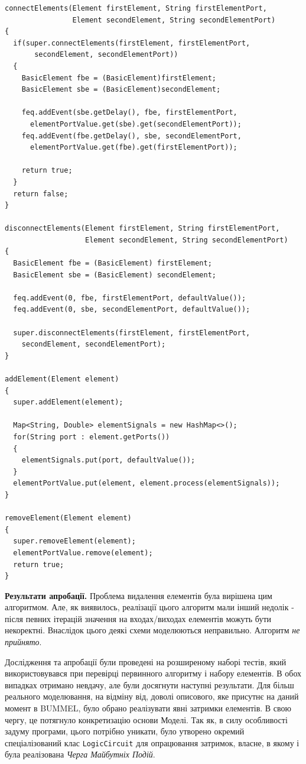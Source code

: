 \documentclass[12pt,a4paper]{article}
\begin{document}
\begin{lstlisting}
connectElements(Element firstElement, String firstElementPort,
 	            Element secondElement, String secondElementPort)
{
  if(super.connectElements(firstElement, firstElementPort,
       secondElement, secondElementPort))
  {
    BasicElement fbe = (BasicElement)firstElement;
    BasicElement sbe = (BasicElement)secondElement;

    feq.addEvent(sbe.getDelay(), fbe, firstElementPort,
      elementPortValue.get(sbe).get(secondElementPort));
    feq.addEvent(fbe.getDelay(), sbe, secondElementPort,
      elementPortValue.get(fbe).get(firstElementPort));

    return true;
  }
  return false;
}

disconnectElements(Element firstElement, String firstElementPort,
                   Element secondElement, String secondElementPort)
{
  BasicElement fbe = (BasicElement) firstElement;
  BasicElement sbe = (BasicElement) secondElement;

  feq.addEvent(0, fbe, firstElementPort, defaultValue());
  feq.addEvent(0, sbe, secondElementPort, defaultValue());

  super.disconnectElements(firstElement, firstElementPort,
    secondElement, secondElementPort);
}

addElement(Element element)
{
  super.addElement(element);

  Map<String, Double> elementSignals = new HashMap<>();
  for(String port : element.getPorts())
  {
    elementSignals.put(port, defaultValue());
  }
  elementPortValue.put(element, element.process(elementSignals));
}

removeElement(Element element)
{
  super.removeElement(element);
  elementPortValue.remove(element);
  return true;
}
\end{lstlisting}

\textbf{Результати апробації.} Проблема видалення елементів була вирішена цим алгоритмом. Але, як виявилось, реалізації цього алгоритм мали інший недолік - після певних ітерацій значення на входах/виходах елементів можуть бути некоректні. Внаслідок цього деякі схеми моделюються неправильно. Алгоритм \emph{не прийнято}.

Дослідження та апробації були проведені на розширеному наборі тестів, який використовувався при перевірці первинного алгоритму і набору елементів. В обох випадках отримано невдачу, але були досягнути наступні результати. Для більш реального моделювання, на відміну від, доволі описового, яке присутнє на даний момент в BUMMEL, було обрано реалізувати явні затримки елементів. В свою чергу, це потягнуло конкретизацію основи Моделі. Так як, в силу особливості задуму програми, цього потрібно уникати, було утворено окремий спеціалізований клас \lstinline$LogicCircuit$ для опрацювання затримок, власне, в якому і була реалізована \emph{Черга Майбутніх Подій}.
\end{document}
